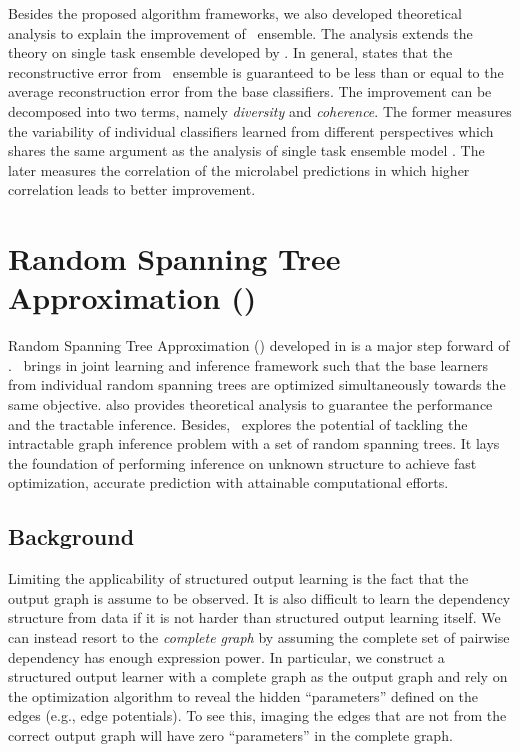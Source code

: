 {Besides the proposed algorithm frameworks, we also developed theoretical analysis to explain the improvement of \mam\ ensemble.
The analysis extends the theory on single task ensemble developed by \citet{Brown10good}.
In general,  states that the reconstructive error from \mam\ ensemble is guaranteed to be less than or equal to the average reconstruction error from the base classifiers.
The improvement can be decomposed into two terms, namely \textit{diversity} and \textit{coherence}.
The former measures the variability of individual classifiers learned from different perspectives which shares the same argument as the analysis of single task ensemble model \citep{Brown10good}.
The later measures the correlation of the microlabel predictions in which higher correlation leads to better improvement.



%
%
\section{Random Spanning Tree Approximation (\rta)}\label{sc_su14c}

Random Spanning Tree Approximation (\rta) developed in  is a major step forward of \mam.
\rta\ brings in joint learning and inference framework such that the base learners from individual random spanning trees are optimized simultaneously towards the same objective.
 also provides theoretical analysis to guarantee the performance and the tractable inference.
Besides, \rta\ explores the potential of tackling the intractable graph inference problem with a set of random spanning trees.
It lays the foundation of performing inference on unknown structure to achieve fast optimization, accurate prediction with attainable computational efforts.



%
%
\subsection{Background}

Limiting the applicability of structured output learning is the fact that the output graph is assume to be observed.
It is also difficult to learn the dependency structure from data \citep{Chickering94learning} if it is not harder than structured output learning itself.
We can instead resort to the \textit{complete graph} by assuming the complete set of pairwise dependency has enough expression power.
In particular, we construct a structured output learner with a complete graph as the output graph and rely on the optimization algorithm to reveal the hidden ``parameters'' defined on the edges (e.g., edge potentials).
To see this, imaging the edges that are not from the correct output graph will have zero ``parameters'' in the complete graph.

}

